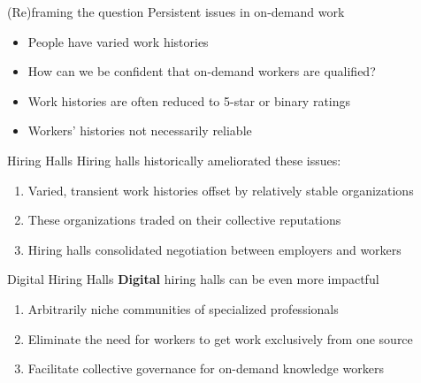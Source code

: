 \documentclass[presentation]{subfiles}
\begin{document}
\begin{frame}{(Re)framing the question}
Persistent issues in on-demand work
\begin{itemize}
\item People have varied work histories
\item How can we be confident that on-demand workers are qualified?
\item Work histories are often reduced to 5-star or binary ratings
\item Workers' histories not necessarily reliable
\end{itemize}

\end{frame}

\begin{frame}{Hiring Halls}
  Hiring halls historically ameliorated these issues:
  \begin{enumerate}
    \item Varied, transient work histories offset by relatively stable organizations
    \item These organizations traded on their collective reputations
    \item Hiring halls consolidated negotiation between employers and workers
  \end{enumerate}

\end{frame}

\begin{frame}{Digital Hiring Halls}
\textbf{Digital} hiring halls can be even more impactful
  \begin{enumerate}
    \item<+-> Arbitrarily niche communities of specialized professionals
    \item<+-> Eliminate the need for workers to get work exclusively from one source
    \item<+-> Facilitate collective governance for on-demand knowledge workers
  \end{enumerate}
\end{frame}


\end{document}
